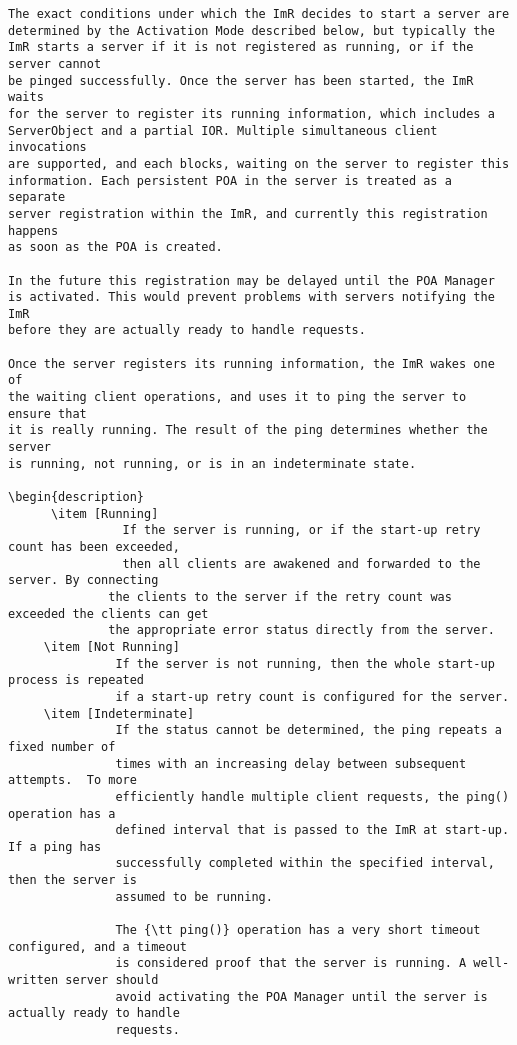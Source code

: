\begin{itemize}
{\begin{itemize}
{{\begin{itemize}
\begin{verbatim}
The exact conditions under which the ImR decides to start a server are 
determined by the Activation Mode described below, but typically the 
ImR starts a server if it is not registered as running, or if the server cannot 
be pinged successfully. Once the server has been started, the ImR waits 
for the server to register its running information, which includes a 
ServerObject and a partial IOR. Multiple simultaneous client invocations 
are supported, and each blocks, waiting on the server to register this 
information. Each persistent POA in the server is treated as a separate 
server registration within the ImR, and currently this registration happens 
as soon as the POA is created. 

In the future this registration may be delayed until the POA Manager 
is activated. This would prevent problems with servers notifying the ImR 
before they are actually ready to handle requests. 

Once the server registers its running information, the ImR wakes one of 
the waiting client operations, and uses it to ping the server to ensure that 
it is really running. The result of the ping determines whether the server 
is running, not running, or is in an indeterminate state.

\begin{description}
      \item [Running]
                If the server is running, or if the start-up retry count has been exceeded, 
                then all clients are awakened and forwarded to the server. By connecting 
              the clients to the server if the retry count was exceeded the clients can get 
              the appropriate error status directly from the server. 
     \item [Not Running]
               If the server is not running, then the whole start-up process is repeated 
               if a start-up retry count is configured for the server. 
     \item [Indeterminate]
               If the status cannot be determined, the ping repeats a fixed number of 
               times with an increasing delay between subsequent attempts.  To more 
               efficiently handle multiple client requests, the ping() operation has a 
               defined interval that is passed to the ImR at start-up. If a ping has 
               successfully completed within the specified interval, then the server is 
               assumed to be running. 

               The {\tt ping()} operation has a very short timeout configured, and a timeout 
               is considered proof that the server is running. A well-written server should 
               avoid activating the POA Manager until the server is actually ready to handle 
               requests.
 

\end{verbatim}
\end{itemize}}}
\end{itemize}}
\end{itemize}
